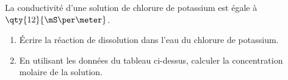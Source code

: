 La conductivité d'une solution de chlorure de potassium  est égale à
$\qty{12}{\mS\per\meter}$.
\begin{enumerate}
    \item Écrire la réaction de dissolution dans l'eau du chlorure de potassium.
    \item En utilisant les données du tableau ci-dessus, calculer la
          concentration molaire de la solution.
\end{enumerate}


